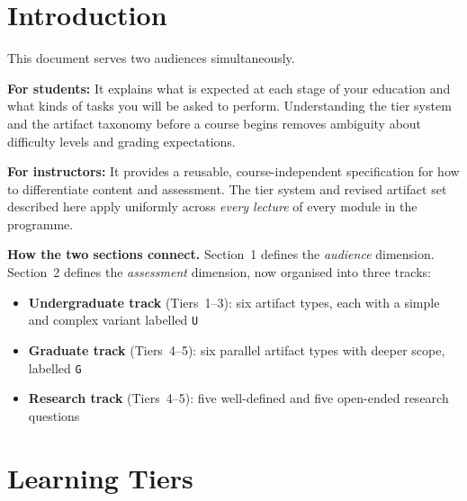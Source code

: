 \documentclass[11pt,a4paper]{article}
\begin{document}
\tableofcontents
\newpage

\section*{Introduction}

\begin{tcolorbox}[goldbox]
This document serves two audiences simultaneously.

\medskip\noindent\textbf{For students:} It explains what is expected at each stage of your
education and what kinds of tasks you will be asked to perform. Understanding the tier
system and the artifact taxonomy before a course begins removes ambiguity about difficulty
levels and grading expectations.

\medskip\noindent\textbf{For instructors:} It provides a reusable, course-independent
specification for how to differentiate content and assessment. The tier system and
revised artifact set described here apply uniformly across \emph{every lecture} of
every module in the programme.
\end{tcolorbox}

\medskip
\noindent\textbf{How the two sections connect.}
Section~1 defines the \emph{audience} dimension. Section~2 defines the
\emph{assessment} dimension, now organised into three tracks:

\begin{itemize}[leftmargin=1.8em]
  \item \textcolor{ugblue}{\textbf{Undergraduate track}} (Tiers~1--3): six artifact types,
        each with a simple and complex variant labelled \texttt{U}
  \item \textcolor{gradred}{\textbf{Graduate track}} (Tiers~4--5): six parallel artifact
        types with deeper scope, labelled \texttt{G}
  \item \textcolor{respath}{\textbf{Research track}} (Tiers~4--5): five well-defined
        and five open-ended research questions
\end{itemize}

\newpage
\section{Learning Tiers}
\label{sec:tiers}
\end{document}
